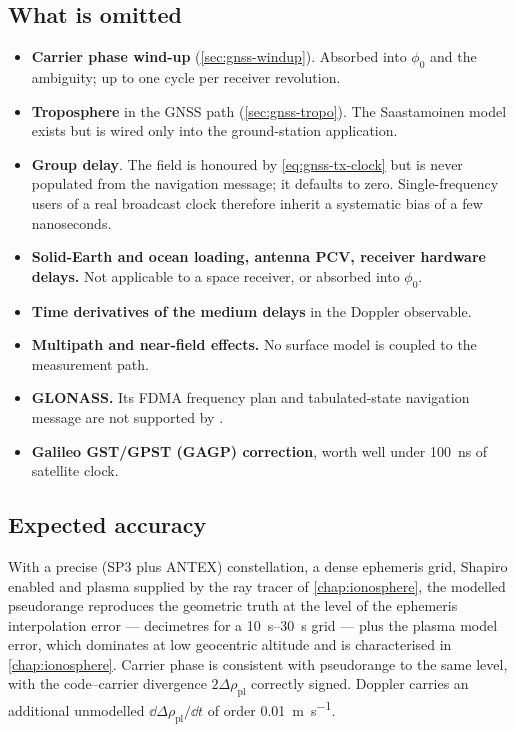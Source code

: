 \subsection{What is omitted}

\begin{itemize}[leftmargin=1.4em,itemsep=1pt]
  \item \textbf{Carrier phase wind-up} (\cref{sec:gnss-windup}). Absorbed into
    $\phi_0$ and the ambiguity; up to one cycle per receiver revolution.
  \item \textbf{Troposphere} in the GNSS path (\cref{sec:gnss-tropo}). The
    Saastamoinen model exists but is wired only into the ground-station
    application.
  \item \textbf{Group delay}. The  field is honoured by
    \cref{eq:gnss-tx-clock} but is never populated from the navigation
    message; it defaults to zero. Single-frequency users of a real broadcast
    clock therefore inherit a systematic bias of a few nanoseconds.
  \item \textbf{Solid-Earth and ocean loading, antenna PCV, receiver
    hardware delays.} Not applicable to a space receiver, or absorbed into
    $\phi_0$.
  \item \textbf{Time derivatives of the medium delays} in the Doppler
    observable.
  \item \textbf{Multipath and near-field effects.} No surface model is coupled
    to the measurement path.
  \item \textbf{GLONASS.} Its FDMA frequency plan and tabulated-state
    navigation message are not supported by .
  \item \textbf{Galileo GST/GPST (GAGP) correction}, worth well under
    \SI{100}{\nano\second} of satellite clock.
\end{itemize}

\subsection{Expected accuracy}

With a precise (SP3 plus ANTEX) constellation, a dense ephemeris grid, Shapiro
enabled and plasma supplied by the ray tracer of \cref{chap:ionosphere}, the
modelled pseudorange reproduces the geometric truth at the level of the
ephemeris interpolation error --- decimetres for a
\SIrange{10}{30}{\second} grid --- plus the plasma model error, which
dominates at low geocentric altitude and is characterised in
\cref{chap:ionosphere}. Carrier phase is consistent with pseudorange to the
same level, with the code--carrier divergence
$2\Delta\rho_{\mathrm{pl}}$ correctly signed. Doppler carries an additional
unmodelled $\dd\Delta\rho_{\mathrm{pl}}/\dd t$ of order
\SI{0.01}{\meter\per\second}.

